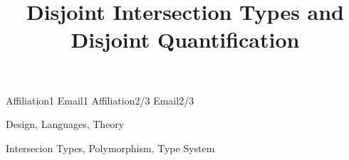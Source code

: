 \documentclass[nocopyrightspace,preprint,9pt]{sigplanconf}
\begin{document}
\setlength{\pdfpageheight}{\paperheight}
\setlength{\pdfpagewidth}{\paperwidth}


\preprintfooter{\name}                        %

\title{Disjoint Intersection Types and Disjoint Quantification}

           {Affiliation1}
           {Email1}
           {Affiliation2/3}
           {Email2/3}

\maketitle

\begin{abstract}
  
\end{abstract}


\terms Design, Languages, Theory

\keywords Intersecion Types, Polymorphism, Type System













\clearpage
\onecolumn

\appendix


\end{document}
